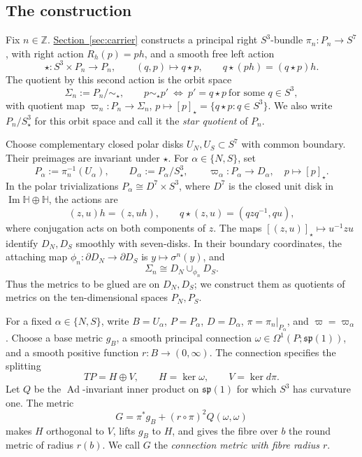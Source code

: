 \documentclass[12pt]{amsart}
\numberwithin{equation}{section}
\theoremstyle{remark}
\newcommand{\Hh}{\mathbb H}
\begin{document}
\subsection{The construction}\label{subsec:construction}
Fix \(n\in\mathbb Z\). \hyperref[sec:carrier]{Section~\ref*{sec:carrier}} constructs a
principal right \(S^3\)-bundle \(\pi_n:P_n\to S^7\), with right
action \(R_h(p)=ph\), and a smooth free left action
\[
 \star:S^3\times P_n\longrightarrow P_n,\qquad
 (q,p)\longmapsto q\star p,\qquad
 q\star(ph)=(q\star p)h.
\]
The quotient by this second action is the orbit space
\[
 \Sigma_n:=P_n/{\sim_\star},\qquad
 p\sim_\star p'\ \Longleftrightarrow\
 p'=q\star p\ \text{for some }q\in S^3,
\]
with quotient map
\(\varpi_n:P_n\to\Sigma_n\),
\(p\mapsto[p]_\star=\{q\star p:q\in S^3\}\).
We also write \(P_n/S^3_\star\) for this orbit space and call it
the \emph{star quotient} of \(P_n\).

Choose complementary closed polar disks \(U_N,U_S\subset S^7\)
with common boundary. Their preimages are invariant under \(\star\).
For \(\alpha\in\{N,S\}\), set
\[
 P_\alpha:=\pi_n^{-1}(U_\alpha),\qquad
 D_\alpha:=P_\alpha/S^3_\star,\qquad
 \varpi_\alpha:P_\alpha\longrightarrow D_\alpha,\quad
 p\longmapsto[p]_\star.
\]
In the polar trivializations \(P_\alpha\cong D^7\times S^3\),
where \(D^7\) is the closed unit disk in
\(\operatorname{Im}\Hh\oplus\Hh\), the actions are
\[
 (z,u)h=(z,uh),\qquad q\star(z,u)=(qzq^{-1},qu),
\]
where conjugation acts on both components of \(z\).
The maps \([(z,u)]_\star\mapsto u^{-1}zu\) identify
\(D_N,D_S\) smoothly with seven-disks. In their boundary
coordinates, the attaching map
\(\phi_n:\partial D_N\to\partial D_S\) is \(y\mapsto\sigma^n(y)\),
and
\[
 \Sigma_n\cong D_N\cup_{\phi_n}D_S.
\]
Thus the metrics to be glued are on \(D_N,D_S\); we construct them
as quotients of metrics on the ten-dimensional spaces \(P_N,P_S\).

For a fixed \(\alpha\in\{N,S\}\), write \(B=U_\alpha\),
\(P=P_\alpha\), \(D=D_\alpha\),
\(\pi=\pi_n|_{P_\alpha}\), and \(\varpi=\varpi_\alpha\).
Choose a base metric \(g_B\), a smooth principal connection
\(\omega\in\Omega^1(P;\mathfrak{sp}(1))\), and a smooth positive
function \(r:B\to(0,\infty)\).
The connection specifies the splitting
\[
 TP=H\oplus V,\qquad H=\ker\omega,\qquad V=\ker d\pi.
\]
Let \(Q\) be the \(\operatorname{Ad}\)-invariant inner product on
\(\mathfrak{sp}(1)\) for which \(S^3\) has curvature one. The metric
\[
 G=\pi^*g_B+(r\circ\pi)^2Q(\omega,\omega)
\]
makes \(H\) orthogonal to \(V\), lifts \(g_B\) to \(H\), and gives
the fibre over \(b\) the round metric of radius \(r(b)\). We call
\(G\) the \emph{connection metric with fibre radius \(r\)}.
\end{document}
